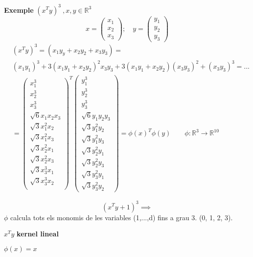 \textbf{Exemple} $(x^Ty)^3 \ ,x,y \in \mathbb{R}^3$
$$
x = \begin{pmatrix}
x_1 \\
x_2 \\
x_3
\end{pmatrix};
\quad 
y = \begin{pmatrix}
y_1 \\
y_2 \\
y_3
\end{pmatrix}
$$
\begin{align*}
	& (x^Ty)^3 = (x_1y_y + x_2y_2 + x_3y_3) = \\
	& (x_1y_1)^3 + 3(x_1y_1 + x_2y_2)^2 x_3y_3 + 3(x_1y_1 +
	 x_2y_2)(x_3y_3)^2 + (x_3y_3)^3 = ... \\
	& = 
	\begin{pmatrix}
	x_1^3 \\
	x_2^3 \\
	x_3^3 \\
	\sqrt{6} x_1x_2x_3 \\
	\sqrt{3} x_1^2x_2 \\
	\sqrt{3} x_1^2x_3 \\
	\sqrt{3} x_2^2x_1 \\
	\sqrt{3} x_2^2x_3 \\
	\sqrt{3} x_3^3x_1 \\
	\sqrt{3} x_3^3x_2 \\
	\end{pmatrix}^T 
	\begin{pmatrix}
	y_1^3 \\
	y_2^3 \\
	y_3^3 \\
	\sqrt{6} y_1y_2y_3 \\
	\sqrt{3} y_1^2y_2 \\
	\sqrt{3} y_1^2y_3 \\
	\sqrt{3} y_2^2y_1 \\
	\sqrt{3} y_2^2y_3 \\
	\sqrt{3} y_3^2y_1 \\
	\sqrt{3} y_3^2y_2
	\end{pmatrix}
	= \phi(x)^T\phi(y) \qquad \phi:\mathbb{R}^3 \rightarrow \mathbb{R}^{10}
\end{align*}


$$
(x^Ty + 1)^3 \implies
$$
$\phi$ calcula tots els monomis de les variables (1,...,d) fins a grau 3. (0, 1, 2, 3).

$x^Ty$ \textbf{kernel lineal}

$\phi(x) = x$

